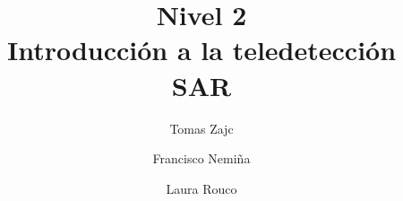 \documentclass[a4paper,12pt]{book}
\title{{\large Nivel 2} \\ Introducción a la teledetección SAR}
\author{Tomas Zajc \and Francisco Nemiña \and Laura Rouco}
\begin{document}
\frontmatter
\maketitle
\titlepage



\mainmatter





\appendix


\backmatter
\end{document}
